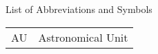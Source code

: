 \noindent \Large List of Abbreviations and Symbols \normalsize \\

\begin{flushleft}
\begin{longtable}{ll}
\endfirsthead
\endhead
\endfoot
\endlastfoot
AU & Astronomical Unit \\
\end{longtable}
\end{flushleft}

